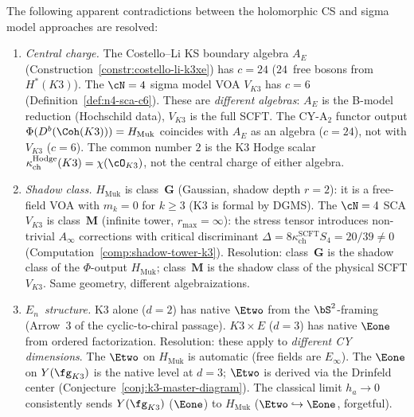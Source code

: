 \begin{proposition}
\label{prop:hcs-vs-sigma}
The following apparent contradictions between the holomorphic CS and sigma model approaches are resolved:
\begin{enumerate}[label=\textup{(\roman*)}]
 \item \emph{Central charge.} The Costello--Li KS boundary algebra $A_E$ (Construction~\textup{\ref{constr:costello-li-k3xe}}) has $c = 24$ ($24$~free bosons from $H^*(K3)$). The $\cN = 4$ sigma model VOA $V_{K3}$ has $c = 6$ (Definition~\textup{\ref{def:n4-sca-c6}}). These are \emph{different algebras}: $A_E$ is the B-model reduction (Hochschild data), $V_{K3}$ is the full SCFT. The CY-A$_2$ functor output $\Phi(D^b(\Coh(K3))) = H_{\mathrm{Muk}}$ coincides with $A_E$ as an algebra ($c = 24$), not with $V_{K3}$ ($c = 6$). The common number $2$ is the K3 Hodge scalar $\kappa_{\mathrm{ch}}^{\mathrm{Hodge}}(K3)=\chi(\cO_{K3})$, not the central charge of either algebra.

 \item \emph{Shadow class.} $H_{\mathrm{Muk}}$ is class~$\mathbf{G}$ (Gaussian, shadow depth $r = 2$): it is a free-field VOA with $m_k = 0$ for $k \geq 3$ (K3 is formal by DGMS). The $\cN = 4$ SCA $V_{K3}$ is class~$\mathbf{M}$ (infinite tower, $r_{\max} = \infty$): the stress tensor introduces non-trivial $A_\infty$ corrections with critical discriminant $\Delta = 8\kappa_{\mathrm{ch}}^{\mathrm{SCFT}} S_4 = 20/39 \neq 0$ (Computation~\textup{\ref{comp:shadow-tower-k3}}). Resolution: class~$\mathbf{G}$ is the shadow class of the $\Phi$-output $H_{\mathrm{Muk}}$; class~$\mathbf{M}$ is the shadow class of the physical SCFT $V_{K3}$. Same geometry, different algebraizations.

 \item \emph{$E_n$~structure.} K3 alone ($d = 2$) has native $\Etwo$ from the $\bS^2$-framing (Arrow~3 of the cyclic-to-chiral passage). $K3 \times E$ ($d = 3$) has native $\Eone$ from ordered factorization. Resolution: these apply to \emph{different CY dimensions}. The $\Etwo$ on $H_{\mathrm{Muk}}$ is automatic (free fields are $E_\infty$). The $\Eone$ on $Y(\fg_{K3})$ is the native level at $d = 3$; $\Etwo$ is derived via the Drinfeld center (Conjecture~\textup{\ref{conj:k3-master-diagram}}). The classical limit $h_a \to 0$ consistently sends $Y(\fg_{K3})$ ($\Eone$) to $H_{\mathrm{Muk}}$ ($\Etwo \hookrightarrow \Eone$, forgetful).


\end{enumerate}
\end{proposition}
